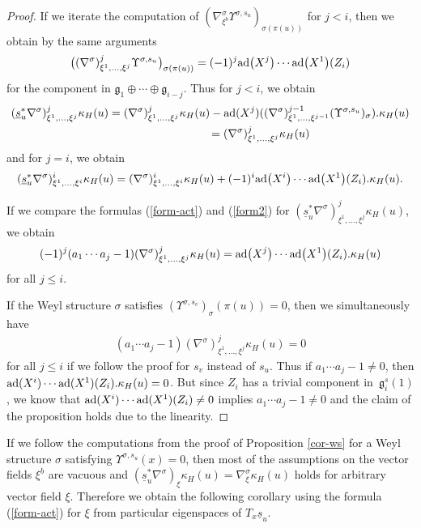 \documentclass[10pt,a4paper]{amsart}
\newcommand{\ka}{\kappa}
\newcommand{\si}{\sigma}
\newcommand{\un}{\underline}
\newcommand{\fg}{\mathfrak g}
\newcommand{\na}{\nabla}
\newcommand{\U}{\Upsilon}
\newcommand{\ad}{{\rm ad}}
\numberwithin{equation}{section}
\begin{document}
\begin{proof}
If we iterate the computation of $(\na^\si_{\xi^b} \U^{\si,s_u})_{\si(\pi(u))}$ for $j<i$, then we obtain by the same arguments
\begin{gather*}\big((\nabla^\si)^j_{\xi^1,\dots,\xi^j} \U^{\si,s_u}\big)_{\si(\pi(u))}=(-1)^j\ad\big(X^j\big)\cdots \ad\big(X^1\big)(Z_i)\end{gather*}
for the component in $\fg_1\oplus \cdots \oplus \fg_{i-j}$. Thus for $j<i$, we obtain
\begin{gather*}
(\un s_u^*\nabla^\si)^j_{\xi^1,\dots,\xi^j} \ka_H(u) =(\nabla^\si)^{j}_{\xi^1,\dots,\xi^{j}} \ka_H(u)-\ad(X^{j})((\nabla^\si)^{j-1}_{\xi^1,\dots,\xi^{j-1}}(\U^{\si,s_u})_\si).\ka_H(u)\\
\hphantom{(\un s_u^*\nabla^\si)^j_{\xi^1,\dots,\xi^j} \ka_H(u)}{}
=(\nabla^\si)^{j}_{\xi^1,\dots,\xi^{j}} \ka_H(u)
\end{gather*}
and for $j=i$, we obtain
\begin{gather} \label{form2}
(\un s_u^*\nabla^\si)^i_{\xi^1,\dots,\xi^i} \ka_H(u)=(\nabla^\si)^i_{\xi^1,\dots,\xi^i} \ka_H(u)+(-1)^i\ad\big(X^i\big)\cdots \ad\big(X^1\big)(Z_i).\kappa_H(u).
\end{gather}

If we compare the formulas (\ref{form-act}) and (\ref{form2}) for $(\un s_u^*\nabla^\si)^j_{\xi^1,\dots,\xi^j} \ka_H(u)$, we obtain
\begin{gather}\label{gl--zavorka}
(-1)^j(a_1\cdots a_j-1)(\nabla^\si)^j_{\xi^1,\dots,\xi^j} \ka_H(u) =\ad\big(X^j\big)\cdots \ad\big(X^1\big)(Z_i).\kappa_H(u)
\end{gather}
for all $j\leq i.$

If the Weyl structure $\si$ satisf\/ies $(\U^{\si,s_v})_\si(\pi(u))=0$, then we simultaneously have
\begin{gather*}(a_1\cdots a_j-1)(\nabla^\si)^j_{\xi^1,\dots,\xi^j} \ka_H(u)=0\end{gather*}
for all $j\leq i$ if we follow the proof for $s_v$ instead of $s_u$. Thus if $a_1\cdots a_j-1\neq 0$, then $\ad(X^i)\cdots \ad(X^1)(Z_i).\kappa_H(u)=0$. But since $Z_i$ has a trivial component in~$\fg_i^s(1)$, we know that $\ad(X^i)\cdots \ad(X^1)(Z_i)\neq 0$ implies $a_1\cdots a_j-1\neq 0$ and the claim of the proposition holds due to the linearity.
\end{proof}

If we follow the computations from the proof of Proposition \ref{cor-ws} for a Weyl structure $\si$ satisfying $\U^{\si,s_u}(x)=0$, then most of the assumptions on the vector f\/ields $\xi^b$ are vacuous and $(\un s_u^*\nabla^\si)_{\xi} \ka_H(u)=\nabla^{\si}_{\xi} \ka_H(u)$ holds for arbitrary vector f\/ield $\xi$. Therefore we obtain the following corollary using the formula (\ref{form-act}) for $\xi$ from particular eigenspaces of $T_x\un s_u$.
\end{document}
